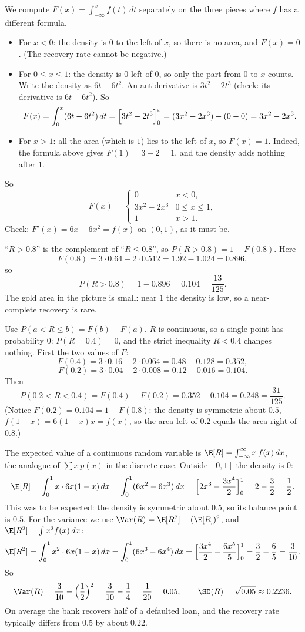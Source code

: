\begin{solution}
	 We compute $F(x)=\int_{-\infty}^{x}f(t)\,dt$ separately on the
	three pieces where $f$ has a different formula.
	\begin{itemize}
		\item For $x<0$: the density is $0$ to the left of $x$, so there is no
		      area, and $F(x)=0$. (The recovery rate cannot be negative.)
		\item For $0\le x\le1$: the density is $0$ left of $0$, so only the
		      part from $0$ to $x$ counts. Write the density as $6t-6t^2$. An
		      antiderivative is $3t^2-2t^3$ (check: its derivative is
		      $6t-6t^2$). So
		      \[
			      F(x)=\int_0^x (6t-6t^2)\,dt=\Bigl[3t^2-2t^3\Bigr]_0^x
			      =(3x^2-2x^3)-(0-0)=3x^2-2x^3.
		      \]
		\item For $x>1$: all the area (which is $1$) lies to the left of $x$,
		      so $F(x)=1$. Indeed, the formula above gives $F(1)=3-2=1$, and
		      the density adds nothing after $1$.
	\end{itemize}
	So
	\[
		F(x)=\begin{cases}
			0          & x<0,          \\
			3x^2-2x^3  & 0\le x\le 1,  \\
			1          & x>1.
		\end{cases}
	\]
	Check: $F'(x)=6x-6x^2=f(x)$ on $(0,1)$, as it must be.

	 ``$R>0.8$'' is the complement of ``$R\le0.8$'', so
	$P(R>0.8)=1-F(0.8)$. Here
	\[
		F(0.8)=3\cdot0.64-2\cdot0.512=1.92-1.024=0.896,
	\]
	so
	\[
		P(R>0.8)=1-0.896=0.104=\frac{13}{125}.
	\]
	The gold area in the picture is small: near $1$ the density is low, so a
	near-complete recovery is rare.

	 Use $P(a<R\le b)=F(b)-F(a)$. $R$ is continuous, so a single
	point has probability $0$: $P(R=0.4)=0$, and the strict inequality $R<0.4$
	changes nothing. First the two values of $F$:
	\[
		F(0.4)=3\cdot0.16-2\cdot0.064=0.48-0.128=0.352,
	\]
	\[
		F(0.2)=3\cdot0.04-2\cdot0.008=0.12-0.016=0.104.
	\]
	Then
	\[
		P(0.2<R<0.4)=F(0.4)-F(0.2)=0.352-0.104=0.248=\frac{31}{125}.
	\]
	(Notice $F(0.2)=0.104=1-F(0.8)$: the density is symmetric about $0.5$,
	$f(1-x)=6(1-x)x=f(x)$, so the area left of $0.2$ equals the area right of
	$0.8$.)

	 The expected value of a continuous random variable is
	$\E[R]=\int_{-\infty}^{\infty}x\,f(x)\,dx$, the analogue of
	$\sum x\,p(x)$ in the discrete case. Outside $[0,1]$ the density is $0$:
	\[
		\E[R]=\int_0^1 x\cdot6x(1-x)\,dx=\int_0^1(6x^2-6x^3)\,dx
		=\Bigl[2x^3-\frac{3x^4}{2}\Bigr]_0^1=2-\frac32=\frac12 .
	\]
	This was to be expected: the density is symmetric about $0.5$, so its
	balance point is $0.5$. For the variance we use
	$\Var(R)=\E[R^2]-(\E[R])^2$, and $\E[R^2]=\int x^2f(x)\,dx$:
	\[
		\E[R^2]=\int_0^1 x^2\cdot6x(1-x)\,dx=\int_0^1(6x^3-6x^4)\,dx
		=\Bigl[\frac{3x^4}{2}-\frac{6x^5}{5}\Bigr]_0^1=\frac32-\frac65=\frac3{10}.
	\]
	So
	\[
		\Var(R)=\frac3{10}-\Bigl(\frac12\Bigr)^2=\frac3{10}-\frac14=\frac1{20}=0.05,
		\qquad
		\SD(R)=\sqrt{0.05}\approx0.2236 .
	\]
	On average the bank recovers half of a defaulted loan, and the recovery
	rate typically differs from $0.5$ by about $0.22$.


\end{solution}
